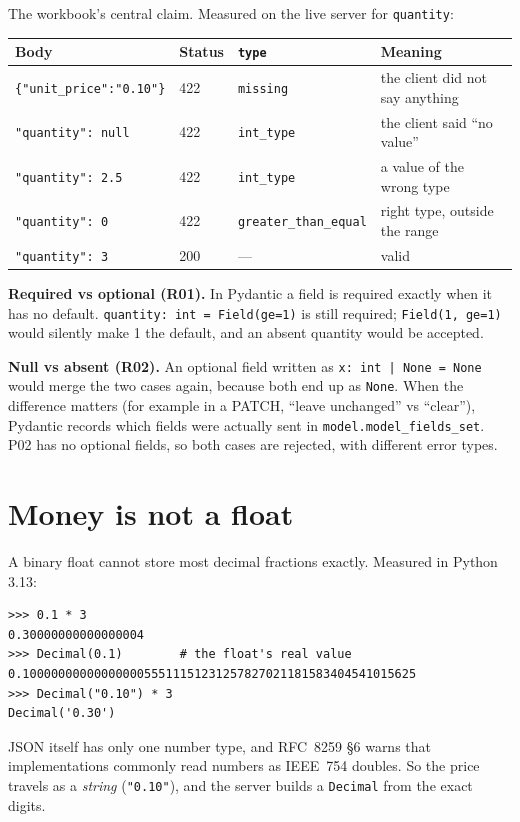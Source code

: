 \documentclass[11pt,a4paper]{article}
\newcommand{\code}[1]{\texttt{#1}}
\begin{document}
The workbook's central claim. Measured on the live server for \code{quantity}:

\begin{tabularx}{\linewidth}{@{}l l l L@{}}
\toprule
\textbf{Body} & \textbf{Status} & \textbf{\code{type}} & \textbf{Meaning} \\
\midrule
\code{\{"unit\_price":"0.10"\}} & 422 & \code{missing} & the client did not say anything \\
\code{"quantity": null} & 422 & \code{int\_type} & the client said ``no value'' \\
\code{"quantity": 2.5} & 422 & \code{int\_type} & a value of the wrong type \\
\code{"quantity": 0} & 422 & \code{greater\_than\_equal} & right type, outside the range \\
\code{"quantity": 3} & 200 & --- & valid \\
\bottomrule
\end{tabularx}

\textbf{Required vs optional (R01).} In Pydantic a field is required exactly when it
has no default. \code{quantity: int = Field(ge=1)} is still required;
\code{Field(1, ge=1)} would silently make 1 the default, and an absent quantity would
be accepted.

\textbf{Null vs absent (R02).} An optional field written as \code{x: int | None = None}
would merge the two cases again, because both end up as \code{None}. When the
difference matters (for example in a PATCH, ``leave unchanged'' vs ``clear''), Pydantic
records which fields were actually sent in \code{model.model\_fields\_set}. P02 has no
optional fields, so both cases are rejected, with different error types.

\section{Money is not a float}

A binary float cannot store most decimal fractions exactly. Measured in Python 3.13:

\begin{Verbatim}[fontsize=\small, frame=single, framesep=2mm]
>>> 0.1 * 3
0.30000000000000004
>>> Decimal(0.1)        # the float's real value
0.1000000000000000055511151231257827021181583404541015625
>>> Decimal("0.10") * 3
Decimal('0.30')
\end{Verbatim}

JSON itself has only one number type, and RFC~8259 \S6 warns that implementations
commonly read numbers as IEEE~754 doubles. So the price travels as a \emph{string}
(\code{"0.10"}), and the server builds a \code{Decimal} from the exact digits.
\end{document}
